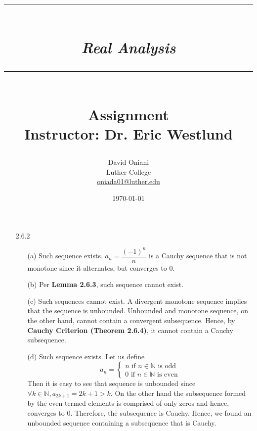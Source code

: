 \documentclass[11pt]{article}
\author{David Oniani\\
        Luther College\\
        \href{mailto:oniada01@luther.edu}{oniada01@luther.edu}}
\title{\rule{\paperwidth - 150pt}{1pt}\textbf{\\\textit{Real Analysis}\\}\rule
{\paperwidth - 150pt}{1pt}\\\textbf{Assignment \textnumero4}\\{\normalsize
Instructor: Dr. Eric Westlund}}
\date{\today}
\newcommand{\nats}{\mathbb{N}}
\begin{document}
\maketitle

%
%
%

\begin{itemize}
    \item[2.6.2]
        \begin{itemize}
            \item[(a)]
                Such sequence exists. $a_n = \dfrac{(-1)^n}{n}$ is a Cauchy
                sequence that is not monotone since it alternates, but
                converges to $0$.

            \item[(b)]
                Per \textbf{Lemma 2.6.3}, such sequence cannot exist.

            \item[(c)]
                Such sequences cannot exist. A divergent monotone sequence
                implies that the sequence is unbounded. Unbounded and monotone
                sequence, on the other hand, cannot contain a convergent
                subsequence. Hence, by \textbf{Cauchy Criterion (Theorem
                2.6.4)}, it cannot contain a Cauchy subsequence.

            \item[(d)]
                Such sequence exists. Let us define
                \begin{equation*}
                    a_n =
                    \begin{cases}
                        n \text{ if } n \in \nats \text{ is odd}\\
                        0 \text{ if } n \in \nats \text{ is even}
                    \end{cases}
                \end{equation*}
                Then it is easy to see that sequence is unbounded since
                $\forall k \in \nats, a_{2k + 1} = 2k + 1 > k$. On the other
                hand the subsequence formed by the even-termed elements is
                comprised of only zeros and hence, converges to $0$. Therefore,
                the subsequence is Cauchy. Hence, we found an unbounded
                sequence containing a subsequence that is Cauchy.
        \end{itemize}


\end{itemize}
\end{document}
